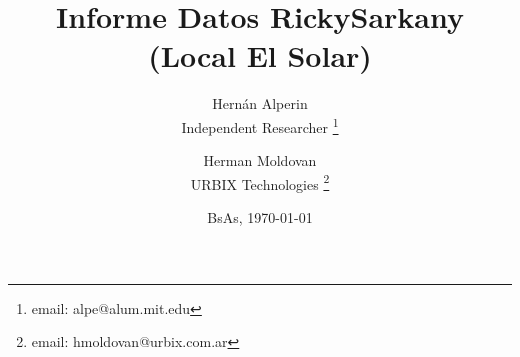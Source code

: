 \documentclass[12pt]{article}
\begin{document}
\title{Informe Datos RickySarkany (Local El Solar)}
\author{
Hernán Alperin\\
Independent Researcher
  \thanks{email: alpe@alum.mit.edu}
\and
Herman Moldovan\\
URBIX Technologies
  \thanks{email: hmoldovan@urbix.com.ar}
}
\date{BsAs, \today}
\maketitle




\end{document}

